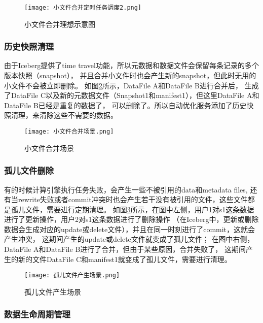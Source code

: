 \begin{figure}[H]
  \centering
  \texttt{[image: 小文件合并定时任务调度2.png]}
  \caption{小文件合并理想示意图}
  \label{fig:小文件合并理想示意图}
\end{figure}

\subsubsection{历史快照清理}

由于Iceberg提供了time travel功能，所以元数据和数据文件会保留每条记录的多个版本快照（snapshot），
并且合并小文件时也会产生新的snapshot，但此时无用的小文件不会被立即删除。
如图\ref{fig:小文件合并场景}所示，DataFile A和DataFile B进行合并后，
生成了DataFile C以及新的元数据文件（Snapshot1和manifest1），但这里DataFile A和DataFile B已经是重复的数据了，
可以删除了。所以自动优化服务添加了历史快照清理，来清除这些不需要的数据。

\begin{figure}[H]
  \centering
  \texttt{[image: 小文件合并场景.png]}
  \caption{小文件合并场景}
  \label{fig:小文件合并场景}
\end{figure}

\subsubsection{孤儿文件删除}

有的时候计算引擎执行任务失败，会产生一些不被引用的data和metadata files,
还有当rewrite失败或者commit冲突时也会产生若干没有被引用的文件，这些文件都是孤儿文件，需要进行定期清理。
如图\ref{fig:孤儿文件产生场景}所示，在图中左侧，用户1对s1这条数据进行了更新操作，用户2对s1这条数据进行了删除操作
（在Iceberg中，更新或删除数据会生成对应的update或delete文件），并且在同一时刻进行了commit，这就会产生冲突，
这期间产生的update或delete文件就变成了孤儿文件；
在图中右侧，DataFile A和DataFile B进行了合并，但由于某些原因，合并失败了，
这期间产生的新的文件DataFile C和manifest1就变成了孤儿文件，需要进行清理。

\begin{figure}[H]
  \centering
  \texttt{[image: 孤儿文件产生场景.png]}
  \caption{孤儿文件产生场景}
  \label{fig:孤儿文件产生场景}
\end{figure}

\subsubsection{数据生命周期管理}


